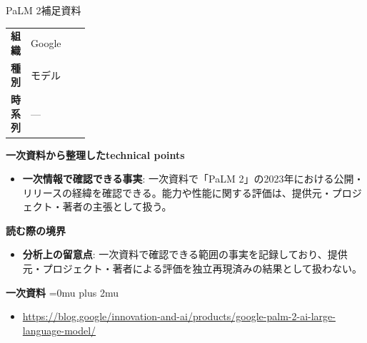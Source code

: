 \begin{technicalnote}{PaLM 2}{補足資料}
\begingroup
\begin{tabularx}{\linewidth}{@{}>{\bfseries}p{0.22\linewidth}X@{}}
組織 & Google \\
種別 & モデル \\
時系列 & — \\
\end{tabularx}
\smallskip
{\bfseries 一次資料から整理したtechnical points}
\begin{itemize}[leftmargin=1.5em,itemsep=0.35em]
\item \textbf{一次情報で確認できる事実}: 一次資料で「PaLM 2」の2023年における公開・リリースの経緯を確認できる。能力や性能に関する評価は、提供元・プロジェクト・著者の主張として扱う。
\end{itemize}
\begin{minipage}{\linewidth}
{\bfseries 読む際の境界}
\begin{itemize}[leftmargin=1.5em,itemsep=0.35em]
\item \textbf{分析上の留意点}: 一次資料で確認できる範囲の事実を記録しており、提供元・プロジェクト・著者による評価を独立再現済みの結果として扱わない。
\end{itemize}
\begin{samepage}
{\bfseries 一次資料}
\begingroup\sloppy
\Urlmuskip=0mu plus 2mu\relax
\begin{itemize}[leftmargin=1.5em,itemsep=0.25em]
\item {\scriptsize\url{https://blog.google/innovation-and-ai/products/google-palm-2-ai-large-language-model/}}
\end{itemize}
\endgroup
\end{samepage}
\end{minipage}
\endgroup
\end{technicalnote}
\medskip

